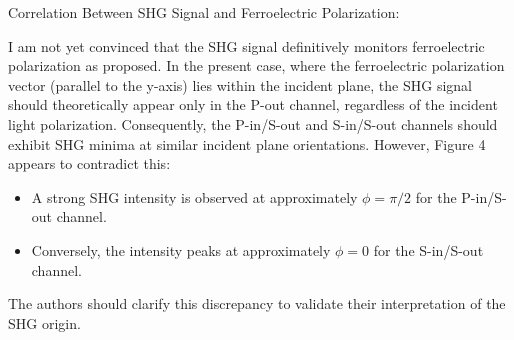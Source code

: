 Correlation Between SHG Signal and Ferroelectric Polarization:

I am not yet convinced that the SHG signal definitively monitors ferroelectric polarization as proposed. In the present case, where the ferroelectric polarization vector (parallel to the y-axis) lies within the incident plane, the SHG signal should theoretically appear only in the P-out channel, regardless of the incident light polarization. Consequently, the P-in/S-out and S-in/S-out channels should exhibit SHG minima at similar incident plane orientations. However, Figure 4 appears to contradict this:
\begin{itemize}
    \item A strong SHG intensity is observed at approximately $\phi = \pi/2$ for the P-in/S-out channel.
    \item Conversely, the intensity peaks at approximately $\phi = 0$ for the S-in/S-out channel.
\end{itemize}
The authors should clarify this discrepancy to validate their interpretation of the SHG origin.
